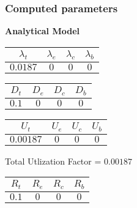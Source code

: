 \documentclass{article}
\begin{document}
\subsubsection{Computed parameters}
\begin{minipage}{0.5\textwidth}
\centering	\textbf{Analytical Model}
\begin{table}[H]
\centering
\begin{tabular}{@{}cccc@{}}
\toprule
$\lambda_t$ & $\lambda_e$ & $\lambda_c$ & $\lambda_b$\\
\midrule
$0.0187$ & $0$ & $0$ & $0$\\
\bottomrule
\end{tabular}
\end{table}\begin{table}[H]
\centering
\begin{tabular}{@{}cccc@{}}
\toprule
$D_t$ & $D_e$ & $D_c$ & $D_b$\\
\midrule
$0.1$ & $0$ & $0$ & $0$\\
\bottomrule
\end{tabular}
\end{table}\begin{table}[H]
\centering
\begin{tabular}{@{}cccc@{}}
\toprule
$U_t$ & $U_e$ & $U_c$ & $U_b$\\
\midrule
$0.00187$ & $0$ & $0$ & $0$\\
\bottomrule
\end{tabular}
\end{table}
\centering Total Utlization Factor = $0.00187$
\begin{table}[H]
\centering
\begin{tabular}{@{}cccc@{}}
\toprule
$R_t$ & $R_e$ & $R_c$ & $R_b$\\
\midrule
$0.1$ & $0$ & $0$ & $0$\\
\bottomrule
\end{tabular}
\end{table}
\end{minipage}
\end{document}
